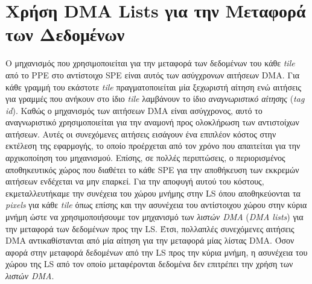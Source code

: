 \section{Χρήση DMA Lists για την Μεταφορά των Δεδομένων}
\label{section:sect54}
\indent
Ο μηχανισμός που χρησιμοποιείται για την μεταφορά των δεδομένων του κάθε \textsl{tile} από το \ac{PPE} στο αντίστοιχο \ac{SPE} είναι αυτός των ασύγχρονων αιτήσεων \ac{DMA}. Για κάθε γραμμή του εκάστοτε \textsl{tile} πραγματοποιείται μία ξεχωριστή αίτηση ενώ αιτήσεις για γραμμές που ανήκουν στο ίδιο \textsl{tile} λαμβάνουν το ίδιο \textsl{αναγνωριστικό αίτησης} (\textsl{tag id}). Καθώς ο μηχανισμός των αιτήσεων \ac{DMA} είναι ασύγχρονος, αυτό το αναγνωριστικό χρησιμοποιείται για την αναμονή προς ολοκλήρωση των αντιστοίχων αιτήσεων. Αυτές οι συνεχόμενες αιτήσεις εισάγουν ένα επιπλέον κόστος στην εκτέλεση της εφαρμογής, το οποίο προέρχεται από τον χρόνο που απαιτείται για την αρχικοποίηση του μηχανισμού. Επίσης, σε πολλές περιπτώσεις, ο περιορισμένος αποθηκευτικός χώρος που διαθέτει το κάθε \ac{SPE} για την αποθήκευση των εκκρεμών αιτήσεων ενδέχεται να μην επαρκεί.\newline \indent 
Για την αποφυγή αυτού του κόστους, εκμεταλλευτήκαμε την συνέχεια του χώρου μνήμης στην \ac{LS} όπου αποθηκεύονται τα \textsl{pixels} για κάθε \textsl{tile} όπως επίσης και την ασυνέχεια του αντίστοιχου χώρου στην κύρια μνήμη ώστε να χρησιμοποιήσουμε τον μηχανισμό των \textsl{λιστών \ac{DMA}} (\textsl{\ac{DMA} lists}) για την μεταφορά των δεδομένων προς την \ac{LS}. Έτσι, πολλαπλές συνεχόμενες αιτήσεις \ac{DMA} αντικαθίστανται από μία αίτηση για την μεταφορά μίας λίστας \ac{DMA}. Όσον αφορά στην μεταφορά δεδομένων από την \ac{LS} προς την κύρια μνήμη, η ασυνέχεια του χώρου της \ac{LS} από τον οποίο μεταφέρονται δεδομένα δεν επιτρέπει την χρήση των \textsl{λιστών \ac{DMA}}.

